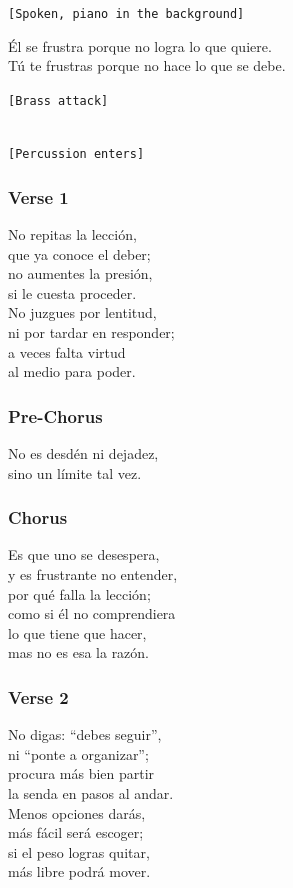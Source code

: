 \texttt{{[}Spoken,\ piano\ in\ the\ background{]}}

Él se frustra porque no logra lo que quiere.\\
Tú te frustras porque no hace lo que se debe.

\texttt{{[}Brass\ attack{]}}\strut \\
\texttt{{[}Percussion\ enters{]}}

\subsubsection{Verse 1}\label{verse-1-25}

No repitas la lección,\\
que ya conoce el deber;\\
no aumentes la presión,\\
si le cuesta proceder.\\
No juzgues por lentitud,\\
ni por tardar en responder;\\
a veces falta virtud\\
al medio para poder.

\subsubsection{Pre-Chorus}\label{pre-chorus-33}

No es desdén ni dejadez,\\
sino un límite tal vez.

\subsubsection{Chorus}\label{chorus-57}

Es que uno se desespera,\\
y es frustrante no entender,\\
por qué falla la lección;\\
como si él no comprendiera\\
lo que tiene que hacer,\\
mas no es esa la razón.

\subsubsection{Verse 2}\label{verse-2-26}

No digas: ``debes seguir'',\\
ni ``ponte a organizar'';\\
procura más bien partir\\
la senda en pasos al andar.\\
Menos opciones darás,\\
más fácil será escoger;\\
si el peso logras quitar,\\
más libre podrá mover.

